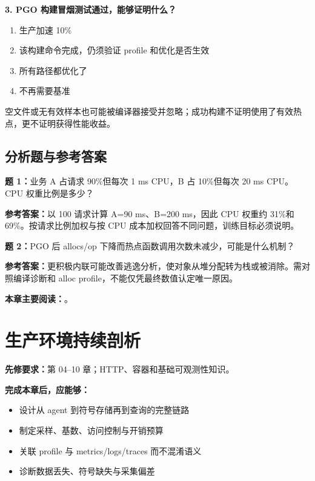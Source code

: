 \documentclass[UTF8,fontset=fandol,openany,11pt]{ctexbook}
\begin{document}
\noindent\textbf{3. PGO 构建冒烟测试通过，能够证明什么？}
\begin{enumerate}[label=\Alph*.]
\item 生产加速 10\%
\item 该构建命令完成，仍须验证 profile 和优化是否生效
\item 所有路径都优化了
\item 不再需要基准
\end{enumerate}
空文件或无有效样本也可能被编译器接受并忽略；成功构建不证明使用了有效热点，更不证明获得性能收益。

\section{分析题与参考答案}
\noindent\textbf{题 1：}业务 A 占请求 90\%但每次 1 ms CPU，B 占 10\%但每次 20 ms CPU。CPU 权重比例是多少？

\noindent\textbf{参考答案：}以 100 请求计算 A=90 ms、B=200 ms，因此 CPU 权重约 31\%和 69\%。按请求比例加权与按 CPU 成本加权回答不同问题，训练目标必须说明。

\noindent\textbf{题 2：}PGO 后 allocs/op 下降而热点函数调用次数未减少，可能是什么机制？

\noindent\textbf{参考答案：}更积极内联可能改善逃逸分析，使对象从堆分配转为栈或被消除。需对照编译诊断和 alloc profile，不能仅凭最终数值认定唯一原因。

\medskip\noindent\textbf{本章主要阅读：}\cite{go-pgo}\cite{go-pgo-blog}\cite{tools-fgprof-source}\cite{go-sync-pool}。
\chapter{生产环境持续剖析}
\label{ch:12}
\par\medskip
\noindent\textbf{先修要求：}第 04–10 章；HTTP、容器和基础可观测性知识。

\noindent\textbf{完成本章后，应能够：}
\begin{itemize}
\item 设计从 agent 到符号存储再到查询的完整链路
\item 制定采样、基数、访问控制与开销预算
\item 关联 profile 与 metrics/logs/traces 而不混淆语义
\item 诊断数据丢失、符号缺失与采集偏差
\end{itemize}
\end{document}
